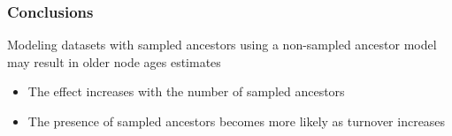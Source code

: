 \documentclass[]{beamer}
\begin{document}
\begin{frame}
\frametitle{Conclusions}
Modeling datasets with sampled ancestors using a non-sampled ancestor model may result in older node ages estimates
\begin{itemize}
\item The effect increases with the number of sampled ancestors
\item The presence of sampled ancestors becomes more likely as turnover increases
\end{itemize}


\end{frame}
\end{document}
